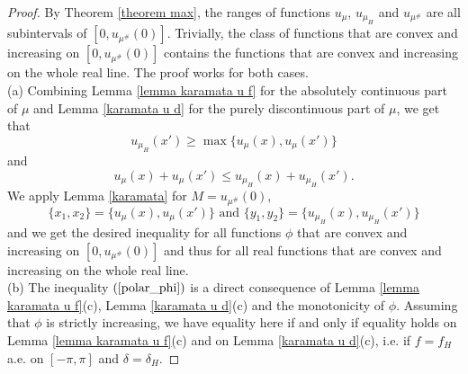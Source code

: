\documentclass[11pt]{amsart}
\numberwithin{equation}{section}
\begin{document}
\begin{proof}
By Theorem \ref{theorem max}, the ranges of functions \(u_\mu\), \(u_{\mu_H}\) and \(u_{\mu^\#}\) are all subintervals of \([0,u_{\mu^\#}(0)]\). Trivially, the class of functions that are convex and increasing on \([0,u_{\mu^\#}(0)]\) contains the functions that are convex and increasing on the whole real line. The proof works for both cases.\\
(a) Combining Lemma \ref{lemma karamata u f} for the absolutely continuous part of \(\mu\) and Lemma \ref{karamata u d} for the purely discontinuous part of \(\mu\), we get that
\[u_{\mu_H}(x')\geq\max\{u_\mu(x),u_\mu(x')\}\]
and 
\[u_\mu(x)+u_\mu(x')\leq u_{\mu_H}(x)+u_{\mu_H}(x').\]
We apply Lemma \ref{karamata} for \(M=u_{\mu^\#}(0)\),
\[\{x_1,x_2\}=\{u_\mu(x),u_\mu(x')\} \text{ and } \{y_1,y_2\}=\{u_{\mu_H}(x),u_{\mu_H}(x')\}\]
and we get the desired inequality for all functions \(\phi\) that are convex and increasing on \([0,u_{\mu^\#}(0)]\) and thus for all real functions that are convex and increasing on the whole real line.\\
(b) The inequality \((\ref{polar_phi})\) is a direct consequence of Lemma \ref{lemma karamata u f}(c), Lemma \ref{karamata u d}(c) and the monotonicity of \(\phi\). Assuming that \(\phi\) is strictly increasing, we have equality here if and only if equality holds on Lemma \ref{lemma karamata u f}(c) and on Lemma \ref{karamata u d}(c), i.e. if \(f=f_H\) a.e. on \([-\pi,\pi]\) and \(\delta=\delta_H\).
\end{proof}
\end{document}
